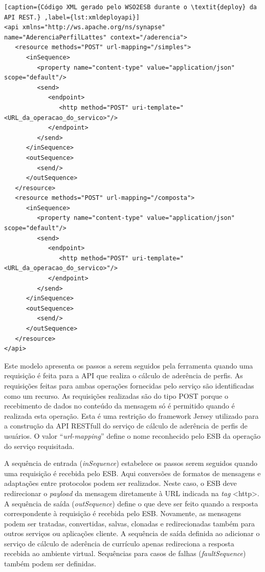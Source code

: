 
\begin{lstlisting}[caption={Código XML gerado pelo WSO2ESB durante o \textit{deploy} da API REST.} ,label={lst:xmldeployapi}]
<api xmlns="http://ws.apache.org/ns/synapse" name="AderenciaPerfilLattes" context="/aderencia">
   <resource methods="POST" url-mapping="/simples">
      <inSequence>
         <property name="content-type" value="application/json" scope="default"/>
         <send>
            <endpoint>
               <http method="POST" uri-template="<URL_da_operacao_do_servico>"/>
            </endpoint>
         </send>
      </inSequence>
      <outSequence>
         <send/>
      </outSequence>
   </resource>
   <resource methods="POST" url-mapping="/composta">
      <inSequence>
         <property name="content-type" value="application/json" scope="default"/>
         <send>
            <endpoint>
               <http method="POST" uri-template="<URL_da_operacao_do_servico>"/>
            </endpoint>
         </send>
      </inSequence>
      <outSequence>
         <send/>
      </outSequence>
   </resource>
</api>
\end{lstlisting}

Este modelo apresenta os passos a serem seguidos pela ferramenta quando uma requisição é feita para a API que realiza o cálculo de aderência de perfis. As requisições feitas para ambas operações fornecidas pelo serviço são identificadas como um recurso. As requisições realizadas são do tipo POST porque o recebimento de dados no conteúdo da mensagem só é permitido quando é realizada esta operação. Esta é uma restrição do framework Jersey utilizado para a construção da API RESTfull do serviço de cálculo de aderência de perfis de usuários. O valor “\textit{url-mapping}” define o nome reconhecido pelo ESB da operação do serviço requisitada.

A sequência de entrada (\textit{inSequence}) estabelece os passos serem seguidos quando uma requisição é recebida pelo ESB. Aqui conversões de formatos de mensagens e adaptações entre protocolos podem ser realizados. Neste caso, o ESB deve redirecionar o \textit{payload} da mensagem diretamente à URL indicada na \textit{tag} <http>. A sequência de saída (\textit{outSequence}) define o que deve ser feito quando a resposta correspondente à requisição é recebida pelo ESB. Novamente, as mensagens podem ser tratadas, convertidas, salvas, clonadas e redirecionadas também para outros serviços ou aplicações cliente. A sequência de saída definida ao adicionar o serviço de cálculo de aderência de currículo apenas redireciona a resposta recebida ao ambiente virtual. Sequências para casos de falhas (\textit{faultSequence}) também podem ser definidas.

